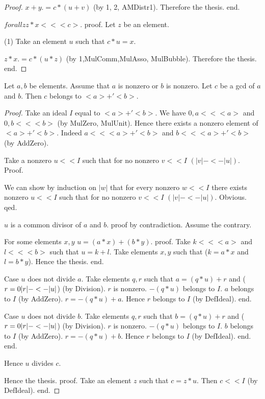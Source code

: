 \documentclass{article}
\begin{document}
\begin{forthel}
\begin{proof}
        $x + y .= c * (u + v)$ (by 1, 2, AMDistr1). Therefore the thesis.
      end.

    $forall z z * x << <c>$.
    proof.
      Let $z$ be an element.

      (1) Take an element $u$ such that $c * u = x$.

      $z * x .= c * (u * z)$ (by 1,MulComm,MulAsso, MulBubble). Therefore the thesis.
    end.
  \end{proof}

  \begin{theorem}[GCDin]
    Let $a,b$ be elements. Assume that $a$ is nonzero or $b$ is nonzero. Let $c$ be a gcd of $a$ and $b$. Then $c$ belongs to $<a> +' <b>$.
  \end{theorem}
  \begin{proof}
    Take an ideal $I$ equal to $<a> +' <b>$. We have $0,a << <a>$ and $0,b << <b>$ (by MulZero, MulUnit). Hence there exists a nonzero element of $<a> +' <b>$. Indeed $a << <a> +' <b>$ and $b << <a> +' <b>$ (by AddZero).

    Take a nonzero $u << I$ such that for no nonzero $v << I$ $(|v| -<- |u|)$.
    Proof.

      We can show by induction on $|w|$ that for every nonzero $w << I$ there
        exists nonzero $u << I$ such that for no nonzero $v << I$ $(|v| -<- |u|)$.
      Obvious.
    qed.

    $u$ is a common divisor of $a$ and $b$.
    proof by contradiction.
      Assume the contrary.

      For some elements $x,y$ $u = (a * x) + (b * y)$.
      proof.
        Take $k << <a>$ and $l << <b>$ such that $u = k + l$. Take elements $x,y$ such that ($k = a * x$ and $l = b * y$). Hence the thesis.
      end.

      Case $u$ does not divide $a$.
        Take elements $q,r$ such that $a = (q * u) + r$ and ($r = 0 \/ |r| -<- |u|$) (by Division). $r$ is nonzero. $- (q * u)$ belongs to $I$. $a$ belongs to $I$ (by AddZero). $r = - (q * u) + a$. Hence $r$ belongs to $I$ (by DefIdeal).
      end.

      Case $u$ does not divide $b$.
        Take elements $q,r$ such that $b = (q * u) + r$ and ($r = 0 \/ |r| -<- |u|$) (by Division). $r$ is nonzero. $- (q * u)$ belongs to $I$. $b$ belongs to $I$ (by AddZero). $r = - (q * u) + b$. Hence $r$ belongs to $I$ (by DefIdeal).
      end.
    end.

    Hence $u$ divides $c$.

    Hence the thesis.
    proof.
      Take an element $z$ such that $c = z * u$. Then $c << I$ (by DefIdeal).
    end.
  \end{proof}
\end{forthel}
\end{document}
